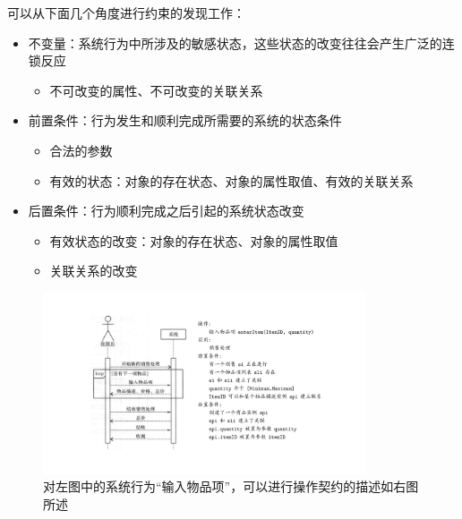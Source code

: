 可以从下面几个角度进行约束的发现工作：
\begin{itemize}
    \item 不变量：系统行为中所涉及的敏感状态，这些状态的改变往往会产生广泛的连锁反应
    \begin{itemize}
        \item 不可改变的属性、不可改变的关联关系
    \end{itemize}
    \item 前置条件：行为发生和顺利完成所需要的系统的状态条件
    \begin{itemize}
        \item 合法的参数
        \item 有效的状态：对象的存在状态、对象的属性取值、有效的关联关系
    \end{itemize}
    \item 后置条件：行为顺利完成之后引起的系统状态改变
    \begin{itemize}
        \item 有效状态的改变：对象的存在状态、对象的属性取值
        \item 关联关系的改变
    \end{itemize}
\end{itemize}

\begin{figure}[H]
    \centering
    \vspace{-0.2em}
	\includegraphics[width=0.85\textwidth]{img/使用对象约束语言建立契约说明.pdf}
    \caption*{对左图中的系统行为“输入物品项”，可以进行操作契约的描述如右图所述}
    \vspace{-1em}
\end{figure}